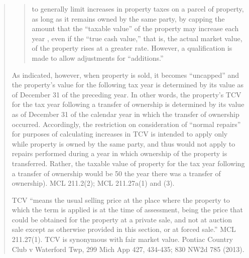 \documentclass[12pt,\documentclassflag]{michiganCourtOfAppealsBrief}
\begin{document}
\begin{quotation}
\begin{quote}
to generally limit increases in property taxes on a parcel of property, as long as it
remains owned by the same party, by capping the amount that the ``taxable value''
of the property may increase each year , even if the ``true cash value,'' that is, the
actual market value, of the property rises at a greater rate. However, a qualification
is made to allow adjustments for ``additions.''
\end{quote}

As indicated, however, when property is sold, it becomes ``uncapped'' and the property's value for
the following tax year is determined by its value as of December 31 of the preceding year. In other
words, the property's TCV for the tax year following a transfer of ownership is determined by its
value as of December 31 of the calendar year in which the transfer of ownership occurred.
Accordingly, the restriction on consideration of ``normal repairs'' for purposes of calculating
increases in TCV is intended to apply only while property is owned by the same party, and thus
would not apply to repairs performed during a year in which ownership of the property is
transferred. Rather, the taxable value of property for the tax year following a transfer of ownership
would be 50%
the year there was a transfer of ownership). MCL 211.2(2); MCL 211.27a(1) and (3).

TCV ``means the usual selling price at the place where the property to which the term is
applied is at the time of assessment, being the price that could be obtained for the property at a
private sale, and not at auction sale except as otherwise provided in this section, or at forced sale.''
MCL 211.27(1). TCV is synonymous with fair market value. Pontiac Country Club v Waterford
Twp, 299 Mich App 427, 434-435; 830 NW2d 785 (2013).


\end{quotation}
\end{document}

